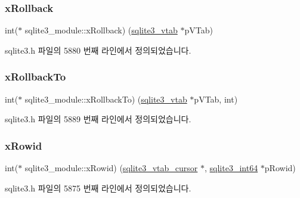 \subsubsection{\texorpdfstring{x\+Rollback}{xRollback}}
{\footnotesize\ttfamily int($\ast$ sqlite3\+\_\+module\+::x\+Rollback) (\hyperlink{structsqlite3__vtab}{sqlite3\+\_\+vtab} $\ast$p\+V\+Tab)}



sqlite3.\+h 파일의 5880 번째 라인에서 정의되었습니다.

\mbox{\label{structsqlite3__module_aaf96452ff3240596b8b8850c2baff3eb}} 
\subsubsection{\texorpdfstring{x\+Rollback\+To}{xRollbackTo}}
{\footnotesize\ttfamily int($\ast$ sqlite3\+\_\+module\+::x\+Rollback\+To) (\hyperlink{structsqlite3__vtab}{sqlite3\+\_\+vtab} $\ast$p\+V\+Tab, int)}



sqlite3.\+h 파일의 5889 번째 라인에서 정의되었습니다.

\mbox{\label{structsqlite3__module_a26c91e3a8a34d356ff36790488e4acf1}} 
\subsubsection{\texorpdfstring{x\+Rowid}{xRowid}}
{\footnotesize\ttfamily int($\ast$ sqlite3\+\_\+module\+::x\+Rowid) (\hyperlink{structsqlite3__vtab__cursor}{sqlite3\+\_\+vtab\+\_\+cursor} $\ast$, \hyperlink{sqlite3_8h_a0a4d3e6c1ad46f90e746b920ab6ca0d2}{sqlite3\+\_\+int64} $\ast$p\+Rowid)}



sqlite3.\+h 파일의 5875 번째 라인에서 정의되었습니다.

\mbox{\label{structsqlite3__module_a3819f1935503e558637647c359193ef9}} 
